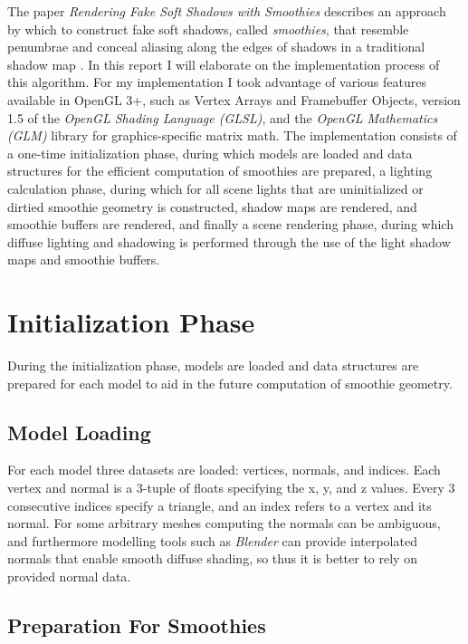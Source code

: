 \documentclass[sigconf]{acmart}
\begin{document}
The paper \textit{Rendering Fake Soft Shadows with Smoothies} describes an approach by which to construct fake soft shadows, called \textit{smoothies}, that resemble penumbrae and conceal aliasing along the edges of shadows in a traditional shadow map \cite{chan:smoothie:egsr2003}. In this report I will elaborate on the implementation process of this algorithm. For my implementation I took advantage of various features available in OpenGL 3+, such as Vertex Arrays and Framebuffer Objects, version 1.5 of the \textit{OpenGL Shading Language (GLSL)}, and the \textit{OpenGL Mathematics (GLM)} library for graphics-specific matrix math. The implementation consists of a one-time initialization phase, during which models are loaded and data structures for the efficient computation of smoothies are prepared, a lighting calculation phase, during which for all scene lights that are uninitialized or dirtied smoothie geometry is constructed, shadow maps are rendered, and smoothie buffers are rendered, and finally a scene rendering phase, during which diffuse lighting and shadowing is performed through the use of the light shadow maps and smoothie buffers.

\section{Initialization Phase}

During the initialization phase, models are loaded and data structures are prepared for each model to aid in the future computation of smoothie geometry.

\subsection{Model Loading}

For each model three datasets are loaded: vertices, normals, and indices. Each vertex and normal is a 3-tuple of floats specifying the x, y, and z values. Every 3 consecutive indices specify a triangle, and an index refers to a vertex and its normal. For some arbitrary meshes computing the normals can be ambiguous, and furthermore modelling tools such as \textit{Blender} can provide interpolated normals that enable smooth diffuse shading, so thus it is better to rely on provided normal data.

\subsection{Preparation For Smoothies}
\end{document}
